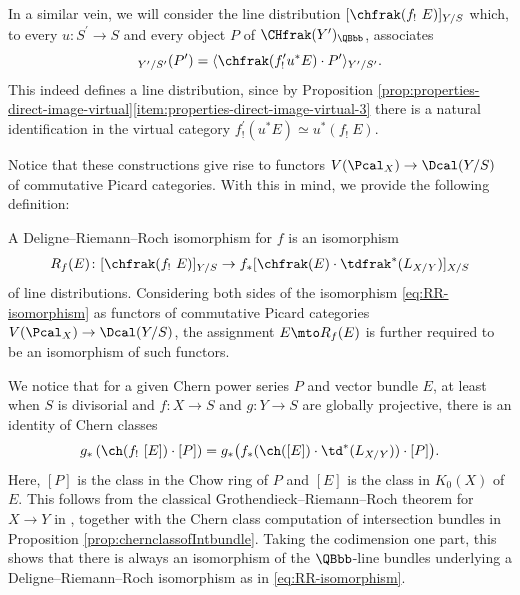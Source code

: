 In a similar vein, we will consider the line distribution $[\chfrak(f_{!}\ E)]_{Y/S}$ which, to every $u\colon S^{\prime}\to S$ and every object $P$ of $\CHfrak(Y^{\prime})_{\QBbb}$, associates\vspace*{-3pt}\enlargethispage{.5\baselineskip}
\begin{displaymath}
[\chfrak(f_!\ E)]_{Y^{\prime}/S^{\prime}}(P^{\prime})=\langle\chfrak(f^{\prime}_{!} u^{\ast} E)\cdot P^{\prime}\rangle_{Y^{\prime}/S^{\prime}}.
\end{displaymath}
This indeed defines a line distribution, since by Proposition \ref{prop:properties-direct-image-virtual}\eqref{item:properties-direct-image-virtual-3} there is a natural identification in the virtual category $f^{\prime}_! (u^{\ast} E) \simeq u^{\ast} (f_!\ E)$.

Notice that these constructions give rise to functors $V(\Pcal_X)\to \Dcal(Y/S)$ of commutative Picard categories. With this in mind, we provide the following definition:
\begin{definition}
A Deligne--Riemann--Roch isomorphism for $f$ is an isomorphism\vspace*{-3pt}
\begin{equation}\label{eq:RR-isomorphism}
R_{f}(E)\colon [\chfrak(f_!\ E)]_{Y/S}\to f_\ast [\chfrak(E) \cdot \tdfrak^{\ast}(L_{X/Y})]_{X/S}
\end{equation}
of line distributions. Considering both sides of the isomorphism \eqref{eq:RR-isomorphism} as functors of commutative Picard categories $V(\Pcal_X)\to \Dcal(Y/S)$, the assignment $E\mto R_{f}(E)$ is further required to be an isomorphism of such functors.
\end{definition}

We notice that for a given Chern power series $P$ and vector bundle $E$, at least when $S$ is divisorial and $f: X \to S$ and $g: Y \to S$ are globally projective, there is an identity of Chern classes\vspace*{-3pt}
\begin{displaymath}
g_\ast \left(\ch(f_!\ [E]) \cdot [P] \right)= g_\ast \bigl(f_{\ast}(\ch([E]) \cdot \td^{\ast}(L_{X/Y})) \cdot [P]\bigr).
\end{displaymath}
Here, $[P]$ is the class in the Chow ring of $P $ and $[E]$ is the class in $K_0(X)$ of $E$. This follows from the classical Grothendieck--Riemann--Roch theorem for $X \to Y$ in \cite[Exp.\,VIII]{SGA6}, together with the Chern class computation of intersection bundles in Proposition \ref{prop:chernclassofIntbundle}. Taking the codimension one part, this shows that there is always an isomorphism of the $\QBbb$-line bundles underlying a Deligne--Riemann--Roch isomorphism as in \eqref{eq:RR-isomorphism}.

